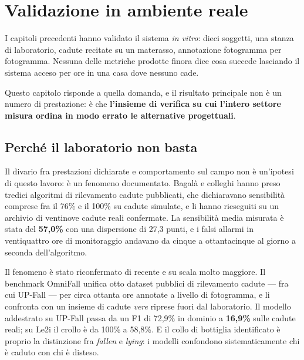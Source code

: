\chapter{Validazione in ambiente reale}
\label{cap:campo}

%
%

I capitoli precedenti hanno validato il sistema \emph{in vitro}: dieci soggetti, una stanza di laboratorio, cadute recitate su un materasso, annotazione fotogramma per fotogramma. Nessuna delle metriche prodotte finora dice cosa succede lasciando il sistema acceso per ore in una casa dove nessuno cade.

Questo capitolo risponde a quella domanda, e il risultato principale non è un numero di prestazione: è che \textbf{l'insieme di verifica su cui l'intero settore misura ordina in modo errato le alternative progettuali}.

\section{Perché il laboratorio non basta}
\label{sec:perche-non-basta}

Il divario fra prestazioni dichiarate e comportamento sul campo non è un'ipotesi di questo lavoro: è un fenomeno documentato. Bagalà e colleghi hanno preso tredici algoritmi di rilevamento cadute pubblicati, che dichiaravano sensibilità comprese fra il 76\% e il 100\% su cadute simulate, e li hanno rieseguiti su un archivio di ventinove cadute reali confermate. La sensibilità media misurata è stata del \textbf{57,0\%} con una dispersione di 27,3 punti, e i falsi allarmi in ventiquattro ore di monitoraggio andavano da cinque a ottantacinque al giorno a seconda dell'algoritmo.

Il fenomeno è stato riconfermato di recente e su scala molto maggiore. Il benchmark OmniFall unifica otto dataset pubblici di rilevamento cadute --- fra cui UP-Fall --- per circa ottanta ore annotate a livello di fotogramma, e li confronta con un insieme di cadute \emph{vere} riprese fuori dal laboratorio. Il modello addestrato su UP-Fall passa da un F1 di 72,9\% in dominio a \textbf{16,9\%} sulle cadute reali; su Le2i il crollo è da 100\% a 58,8\%. E il collo di bottiglia identificato è proprio la distinzione fra \emph{fallen} e \emph{lying}: i modelli confondono sistematicamente chi è caduto con chi è disteso.

